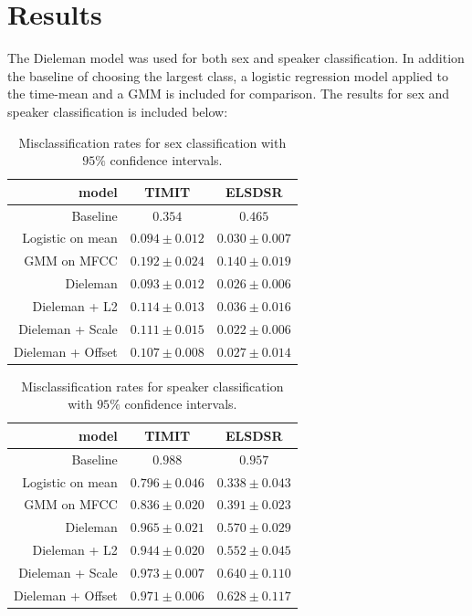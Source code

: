 \section{Results}

The Dieleman model was used for both sex and speaker classification. In addition the baseline of choosing the largest class, a logistic regression model applied to the time-mean and a GMM is included for comparison. The results for sex and speaker classification is included below:
\begin{table}[H]
\centering
\begin{tabular}{r|c|c}
model & TIMIT & ELSDSR \\ \hline
                    Baseline & $0.354$ & $0.465$ \\
                    Logistic on mean & $0.094 \pm 0.012$ & $0.030 \pm 0.007$ \\
                 GMM on MFCC & $0.192 \pm 0.024$ & $0.140 \pm 0.019$ \\
                    Dieleman & $0.093 \pm 0.012$ & $0.026 \pm 0.006$ \\
     Dieleman + L2 & $0.114 \pm 0.013$ & $0.036 \pm 0.016$ \\
  Dieleman + Scale & $0.111 \pm 0.015$ & $0.022 \pm 0.006$ \\
 Dieleman + Offset & $0.107 \pm 0.008$ & $0.027 \pm 0.014$ \\
\end{tabular}
\caption{Misclassification rates for sex classification with $95\%$ confidence intervals.}
\label{tab:results-sex}
\end{table}

\begin{table}[H]
\centering
\begin{tabular}{r|c|c}
model & TIMIT & ELSDSR \\ \hline
                    Baseline & $0.988$ & $0.957$ \\
                    Logistic on mean & $0.796 \pm 0.046$ & $0.338 \pm 0.043$ \\
                 GMM on MFCC & $0.836 \pm 0.020$ & $0.391 \pm 0.023$ \\
                    Dieleman & $0.965 \pm 0.021$ & $0.570 \pm 0.029$ \\
     Dieleman + L2 & $0.944 \pm 0.020$ & $0.552 \pm 0.045$ \\
  Dieleman + Scale & $0.973 \pm 0.007$ & $0.640 \pm 0.110$ \\
 Dieleman + Offset & $0.971 \pm 0.006$ & $0.628 \pm 0.117$ \\
\end{tabular}
\caption{Misclassification rates for speaker classification with $95\%$ confidence intervals.}
\label{tab:results-speaker}
\end{table}

